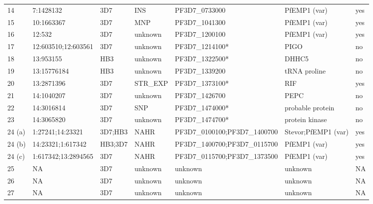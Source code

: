 \begin{landscape}
\begin{table}[]
\begin{tabular}{@{}lllllll@{}}
14     & 7:1428132           & 3D7        &  INS      &  PF3D7\_0733000                 &  PfEMP1 (var)     &  yes          \\
15     & 10:1663367          & 3D7        &  MNP      &  PF3D7\_1041300                 &  PfEMP1 (var)     &  yes          \\
16     & 12:532              & 3D7        &  unknown  &  PF3D7\_1200100                 &  PfEMP1 (var)     &  yes          \\
17     & 12:603510;12:603561 & 3D7        &  unknown  &  PF3D7\_1214100*                &  PIGO             &  no           \\
18     & 13:953155           & HB3        &  unknown  &  PF3D7\_1322500*                &  DHHC5            &  no           \\
19     & 13:15776184         & HB3        &  unknown  &  PF3D7\_1339200                 &  tRNA proline     &  no           \\
20     & 13:2871396          & 3D7        &  STR\_EXP &  PF3D7\_1373100*                &  RIF              &  yes          \\
21     & 14:1040207          & 3D7        &  unknown  &  PF3D7\_1426700                 &  PEPC             &  no           \\
22     & 14:3016814          & 3D7        &  SNP      &  PF3D7\_1474000*                &  probable protein &  no           \\
23     & 14:3065820          & 3D7        &  unknown  &  PF3D7\_1474700*                &  protein kinase   &  no           \\
24 (a) & 1:27241;14:23321    & 3D7;HB3    &  NAHR     &  PF3D7\_0100100;PF3D7\_1400700  &  Stevor;PfEMP1 (var) & yes        \\
24 (b) & 14:23321;1:617342   & HB3;3D7    &  NAHR     &  PF3D7\_1400700;PF3D7\_0115700  &  PfEMP1 (var)     &  yes          \\
24 (c) & 1:617342;13:2894565 & 3D7        &  NAHR     &  PF3D7\_0115700;PF3D7\_1373500  &  PfEMP1 (var)     &  yes          \\
25     & NA                  & 3D7        &  unknown  &  unknown                        &  unknown          &  NA           \\
26     & NA                  & 3D7        &  unknown  &  unknown                        &  unknown          &  NA           \\
27     & NA                  & 3D7        &  unknown  &  unknown                        &  unknown          &  NA           \\
\bottomrule
\end{tabular}
\end{table}
\end{landscape}

